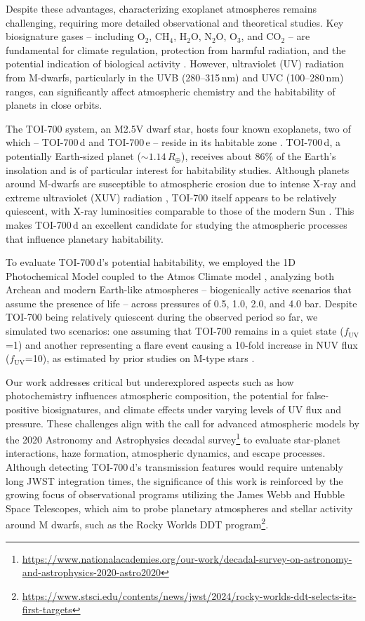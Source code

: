 Despite these advantages, characterizing exoplanet atmospheres remains challenging, requiring more detailed observational and theoretical studies. Key biosignature gases -- including O$_2$, CH$_4$, H$_2$O, N$_2$O, O$_3$, and CO$_2$ -- are fundamental for climate regulation, protection from harmful radiation, and the potential indication of biological activity \citep{Airapetian2017}. However, ultraviolet (UV) radiation from M-dwarfs, particularly in the UVB (280--315\,nm) and UVC (100--280\,nm) ranges, can significantly affect atmospheric chemistry and the habitability of planets in close orbits.

The TOI-700 system, an M2.5V dwarf star, hosts four known exoplanets, two of which -- TOI-700\,d and TOI-700\,e -- reside in its habitable zone \citep{Rodriguez2020, Gilbert.et.al.2023ApJ...944L..35G}. TOI-700\,d, a potentially Earth-sized planet ($\sim1.14\,R_\oplus$), receives about 86\% of the Earth's insolation and is of particular interest for habitability studies. Although planets around M-dwarfs are susceptible to atmospheric erosion due to intense X-ray and extreme ultraviolet (XUV) radiation \citep[e.g.,][]{Nishioka.et.al.2023JGRA..12831405N}, TOI-700 itself appears to be relatively quiescent, with X-ray luminosities comparable to those of the modern Sun \citep{Gilbert2020}. This makes TOI-700\,d an excellent candidate for studying the atmospheric processes that influence planetary habitability.

To evaluate TOI-700\,d's potential habitability, we employed the 1D Photochemical Model coupled to the Atmos Climate model \citep{Arney.et.al.2016AsBio..16..873A}, analyzing both Archean and modern Earth-like atmospheres -- biogenically active scenarios that assume the presence of life -- across pressures of 0.5, 1.0, 2.0, and 4.0 bar. Despite TOI-700 being relatively quiescent during the observed period so far, we simulated two scenarios: one assuming that TOI-700 remains in a quiet state ($f_\mathrm{UV}$=1) and another representing a flare event causing a 10-fold increase in NUV flux ($f_\mathrm{UV}$=10), as estimated by prior studies on M-type stars \citep{Rekhi.et.al.2023ApJ...955...24R}. 

Our work addresses critical but underexplored aspects such as how photochemistry influences atmospheric composition, the potential for false-positive biosignatures, and climate effects under varying levels of UV flux and pressure. These challenges align with the call for advanced atmospheric models by the 2020 Astronomy and Astrophysics decadal survey\footnote{\url{https://www.nationalacademies.org/our-work/decadal-survey-on-astronomy-and-astrophysics-2020-astro2020}} to evaluate star-planet interactions, haze formation, atmospheric dynamics, and escape processes. 
Although detecting TOI-700\,d’s transmission features would require untenably long JWST integration times, the significance of this work is reinforced by the growing focus of observational programs utilizing the James Webb and Hubble Space Telescopes, which aim to probe planetary atmospheres and stellar activity around M dwarfs, such as the Rocky Worlds DDT program\footnote{\url{https://www.stsci.edu/contents/news/jwst/2024/rocky-worlds-ddt-selects-its-first-targets}}.

